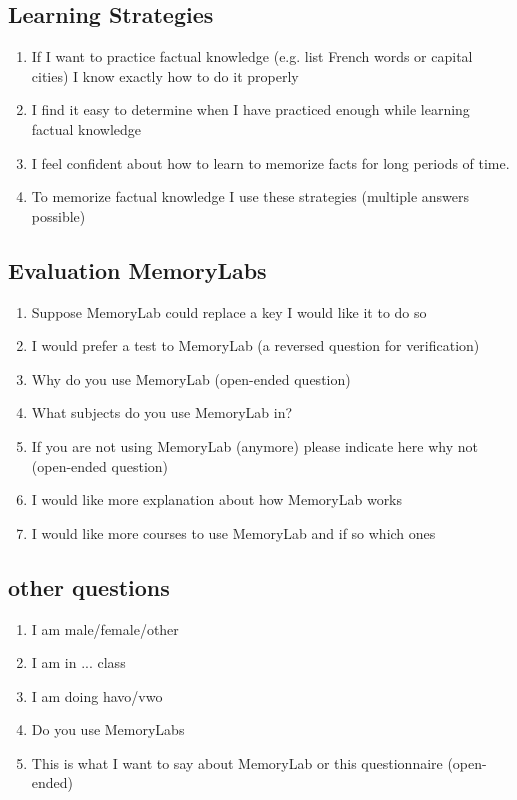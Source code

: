 \documentclass[12pt, a4paper]{article}
\begin{document}
\subsection*{Learning Strategies}
\begin{enumerate}
    \item If I want to practice factual knowledge (e.g. list French words or capital cities) I know exactly how to do it properly
    \item I find it easy to determine when I have practiced enough while learning factual knowledge
    \item I feel confident about how to learn to memorize facts for long periods of time.
    \item To memorize factual knowledge I use these strategies (multiple answers possible)
\end{enumerate}
\subsection*{Evaluation MemoryLabs}
\begin{enumerate}
    \item Suppose MemoryLab could replace a key I would like it to do so
    \item I would prefer a test to MemoryLab (a reversed question for verification)
    \item Why do you use MemoryLab (open-ended question)
    \item What subjects do you use MemoryLab in?
    \item If you are not using MemoryLab (anymore) please indicate here why not (open-ended question)
    \item I would like more explanation about how MemoryLab works
    \item I would like more courses to use MemoryLab and if so which ones
\end{enumerate}
\subsection*{other questions}
\begin{enumerate}
    \item I am male/female/other
    \item I am in ... class
    \item I am doing havo/vwo
    \item Do you use MemoryLabs
    \item This is what I want to say about MemoryLab or this questionnaire (open-ended)
\end{enumerate}
\end{document}
